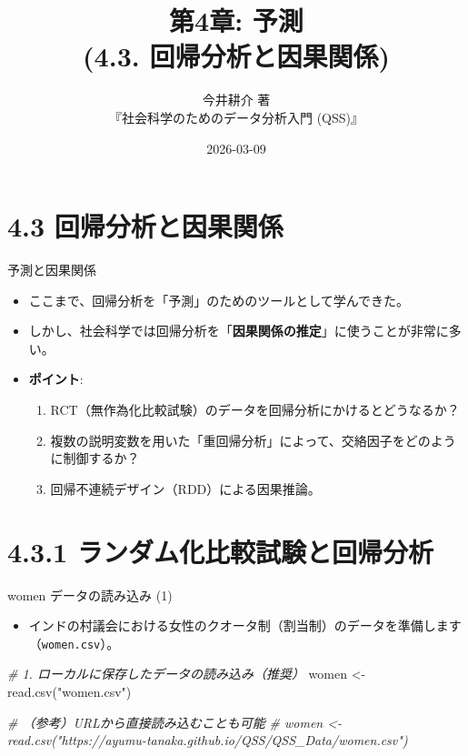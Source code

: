 \documentclass[
  ignorenonframetext,
]{beamer}
\title{第4章: 予測\\
(4.3. 回帰分析と因果関係)}
\subtitle{今井耕介 著\\
『社会科学のためのデータ分析入門 (QSS)』}
\author{}
\date{\vspace{-2.5em}2026-03-09}
\newenvironment{Shaded}{\begin{snugshade}}{\end{snugshade}}
\newcommand{\CommentTok}[1]{\textcolor[rgb]{0.56,0.35,0.01}{\textit{#1}}}
\newcommand{\FunctionTok}[1]{\textcolor[rgb]{0.00,0.00,0.00}{#1}}
\newcommand{\NormalTok}[1]{#1}
\newcommand{\OtherTok}[1]{\textcolor[rgb]{0.56,0.35,0.01}{#1}}
\newcommand{\StringTok}[1]{\textcolor[rgb]{0.31,0.60,0.02}{#1}}
\providecommand{\tightlist}{%
  \setlength{\itemsep}{0pt}\setlength{\parskip}{0pt}}
\begin{document}
\frame{\titlepage}

\hypertarget{ux56deux5e30ux5206ux6790ux3068ux56e0ux679cux95a2ux4fc2}{%
\section{4.3
回帰分析と因果関係}\label{ux56deux5e30ux5206ux6790ux3068ux56e0ux679cux95a2ux4fc2}}

\begin{frame}{予測と因果関係}
\protect\hypertarget{ux4e88ux6e2cux3068ux56e0ux679cux95a2ux4fc2}{}
\begin{itemize}
\tightlist
\item
  ここまで、回帰分析を「予測」のためのツールとして学んできた。
\item
  しかし、社会科学では回帰分析を「\textbf{因果関係の推定}」に使うことが非常に多い。
\item
  \textbf{ポイント}:

  \begin{enumerate}
  \tightlist
  \item
    RCT（無作為化比較試験）のデータを回帰分析にかけるとどうなるか？
  \item
    複数の説明変数を用いた「重回帰分析」によって、交絡因子をどのように制御するか？
  \item
    回帰不連続デザイン（RDD）による因果推論。
  \end{enumerate}
\end{itemize}
\end{frame}

\hypertarget{ux30e9ux30f3ux30c0ux30e0ux5316ux6bd4ux8f03ux8a66ux9a13ux3068ux56deux5e30ux5206ux6790}{%
\section{4.3.1
ランダム化比較試験と回帰分析}\label{ux30e9ux30f3ux30c0ux30e0ux5316ux6bd4ux8f03ux8a66ux9a13ux3068ux56deux5e30ux5206ux6790}}

\begin{frame}[fragile]{women データの読み込み (1)}
\protect\hypertarget{women-ux30c7ux30fcux30bfux306eux8aadux307fux8fbcux307f-1}{}
\begin{itemize}
\tightlist
\item
  インドの村議会における女性のクオータ制（割当制）のデータを準備します（\texttt{women.csv}）。
\end{itemize}

\scriptsize

\begin{Shaded}
\begin{Highlighting}[]
\CommentTok{\# 1. ローカルに保存したデータの読み込み（推奨）}
\NormalTok{women }\OtherTok{\textless{}{-}} \FunctionTok{read.csv}\NormalTok{(}\StringTok{"women.csv"}\NormalTok{)}

\CommentTok{\# （参考）URLから直接読み込むことも可能}
\CommentTok{\# women \textless{}{-} read.csv("https://ayumu{-}tanaka.github.io/QSS/QSS\_Data/women.csv")}
\end{Highlighting}
\end{Shaded}

\normalsize
\end{frame}
\end{document}
